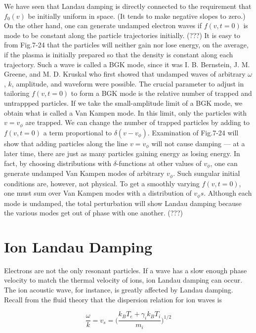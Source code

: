 \documentclass[
  notoc %
]{tufte-book}
\begin{document}
We have seen that Landau damping is directly connected to the
requirement that \(f_0(v)\) be initially uniform in space. (It tends to
make negative slopes to zero.) On the other hand, one can generate
undamped electron waves if \(f(v, t=0)\) is mode to be constant along
the particle trajectories initially. (???) It is easy to from Fig.7-24
that the particles will neither gain nor lose energy, on the average, if
the plasma is initially prepared so that the density is constant along
each trajectory. Such a wave is called a BGK mode, since it was I. B.
Bernstein, J. M. Greene, and M. D. Kruskal who first showed that
undamped waves of arbitrary \(\omega\), \(k\), amplitude, and waveform
were possible. The crucial parameter to adjust in tailoring \(f(v,t=0)\)
to form a BGK mode is the relative number of trapped and untrappped
particles. If we take the small-amplitude limit of a BGK mode, we obtain
what is called a Van Kampen mode. In this limit, only the particles with
\(v=v_\phi\) are trapped. We can change the number of trapped particles
by adding to \(f(v,t=0)\) a term proportional to \(\delta(v-v_\phi)\).
Examination of Fig.7-24 will show that adding particles along the line
\(v=v_\phi\) will not cause damping --- at a later time, there are just
as many particles gaining energy as losing energy. In fact, by choosing
distributions with \(\delta\)-functions at other values of \(v_\phi\),
one can generate undamped Van Kampen modes of arbitrary \(v_\phi\). Such
sungular initial conditions are, however, not physical. To get a
smoothly varying \(f(v,t=0)\), one must sum over Van Kampen modes with a
distribution of \(v_\phi s\). Although each mode is undamped, the total
perturbation will show Landau damping because the various modes get out
of phase with one another. (???)

\hypertarget{ion-landau-damping}{%
\section{Ion Landau Damping}\label{ion-landau-damping}}

Electrons are not the only resonant particles. If a wave has a slow
enough phase velocity to match the thermal velocity of ions, ion Landau
damping can occur. The ion acoustic wave, for instance, is greatly
affected by Landau damping. Recall from the fluid theory that the
dispersion relation for ion waves is

\[
\frac{\omega}{k} = v_s = \Big( \frac{k_BT_e + \gamma_i k_B T_i}{m_i} \Big)^{1/2}
\]
\end{document}

